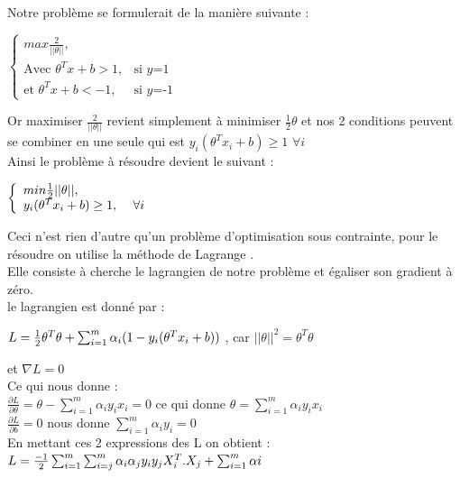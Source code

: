 Notre problème se formulerait de la manière suivante :
\begin{center}
	$ \left\{\begin{array}{ll}
	max  \frac{2}{||\theta||} ,&  \\
     \mbox{Avec } {\theta }^{T}{x} + b > 1	, & \mbox{si } y\mbox{=1} \\
          \mbox{et  } {\theta }^{T}{x} + b < -1	, & \mbox{si } y\mbox{=-1} 
	\end{array}\right.$
\end{center}
Or maximiser $\frac{2}{||\theta||}$ revient simplement à minimiser $ \frac{1}{2}\theta$
et nos 2 conditions peuvent se combiner en une seule qui est ${y}_{i}({\theta }^{T}{x}_{i} + b )\geq 1 $  $\forall i $ \\
Ainsi le problème à résoudre devient le suivant :
\begin{center}
	$ \left\{\begin{array}{ll}
	min  \frac{1}{2} {||\theta||} ,&  \\
	{y}_{i}({\theta }^{T}{x}_{i} + b )\geq 1, &  \mbox{ $ \forall i$ } \\
	\end{array}\right.$
\end{center}
Ceci n'est rien d'autre qu'un problème d'optimisation sous contrainte, pour le résoudre on utilise la méthode de Lagrange .\\
Elle consiste à cherche le lagrangien de notre problème et égaliser son gradient à zéro.\\
le lagrangien est donné par : 
\begin{center}
 $ {\Large L} = \frac{1}{2} {\theta}^{T} \theta + \sum _{i=1}^{m}{\alpha}_{i}(1-{y}_{i}({\theta }^{T}{x}_{i} + b ))$
 , car  $|| {\theta}||^{2} = {\theta}^{T} \theta $ 
\end{center} 
et ${\nabla }{L}=0$ \\
Ce qui nous donne : \\
$\frac{\partial L}{\partial {\theta}} =  \theta -  \sum _{i=1}^{m}{\alpha}_{i}{y}_{i}{x}_{i} =0$   ce qui donne  $\theta =  \sum _{i=1}^{m}{\alpha}_{i}{y}_{i}{x}_{i}$\\
$\frac{\partial L}{\partial {b }} =0 $ nous donne $\sum _{i=1}^{m}{\alpha}_{i}{y}_{i}=0 $ \\
En mettant ces 2 expressions des L on obtient : \\
${\Large L} =\frac{-1}{2} \sum _{i=1}^{m} \sum _{i=j}^{m} {\alpha}_{i}{\alpha}_{j}{y}_{i}{y}_{j} {X}_{i}^{T} . {{X}_{j}}+ \sum _{i=1}^{m} {\alpha}{i} $ \\
